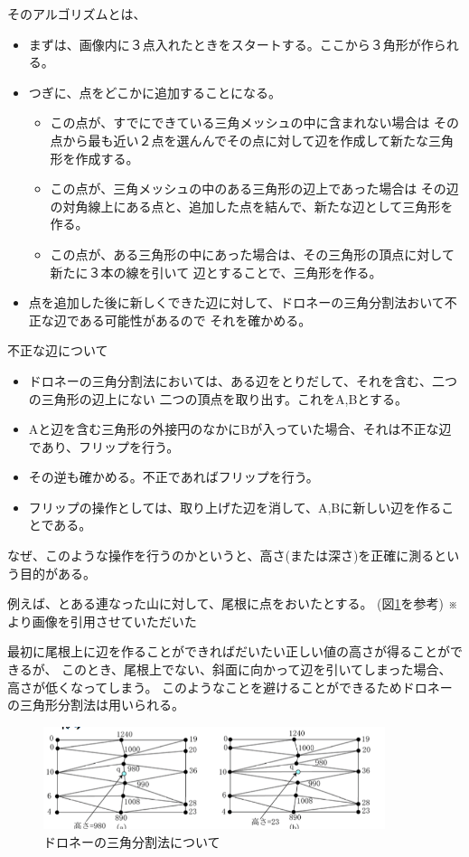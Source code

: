 \documentclass[11pt,a4j]{jsarticle}
\makeatletter
\newcommand{\figcaption}[1]{\def\@captype{figure}\caption{#1}}
\makeatother
\begin{document}
そのアルゴリズムとは、
\begin{itemize}
  \item まずは、画像内に３点入れたときをスタートする。ここから３角形が作られる。
  \item つぎに、点をどこかに追加することになる。
  \begin{itemize}
    \item この点が、すでにできている三角メッシュの中に含まれない場合は
    その点から最も近い２点を選んんでその点に対して辺を作成して新たな三角形を作成する。
    \item この点が、三角メッシュの中のある三角形の辺上であった場合は
    その辺の対角線上にある点と、追加した点を結んで、新たな辺として三角形を作る。
    \item この点が、ある三角形の中にあった場合は、その三角形の頂点に対して新たに３本の線を引いて
    辺とすることで、三角形を作る。
  \end{itemize}
  \item 点を追加した後に新しくできた辺に対して、ドロネーの三角分割法おいて不正な辺である可能性があるので
  それを確かめる。
\end{itemize}

不正な辺について
\begin{itemize}
  \item ドロネーの三角分割法においては、ある辺をとりだして、それを含む、二つの三角形の辺上にない
  二つの頂点を取り出す。これをA,Bとする。
  \item Aと辺を含む三角形の外接円のなかにBが入っていた場合、それは不正な辺であり、フリップを行う。
  \item その逆も確かめる。不正であればフリップを行う。
  \item フリップの操作としては、取り上げた辺を消して、A,Bに新しい辺を作ることである。
\end{itemize}

なぜ、このような操作を行うのかというと、高さ(または深さ)を正確に測るという目的がある。

例えば、とある連なった山に対して、尾根に点をおいたとする。
(図\ref{fig:delaunay}を参考)
※\cite{kimura}より画像を引用させていただいた

最初に尾根上に辺を作ることができればだいたい正しい値の高さが得ることができるが、
このとき、尾根上でない、斜面に向かって辺を引いてしまった場合、高さが低くなってしまう。
このようなことを避けることができるためドロネーの三角形分割法は用いられる。

\begin{figure}[H]
  \centering
  \includegraphics[height=30mm,bb=0 0 657 197]{image/delaunay.png}
  \figcaption{ドロネーの三角分割法について}
  \label{fig:delaunay}
\end{figure}
\end{document}
